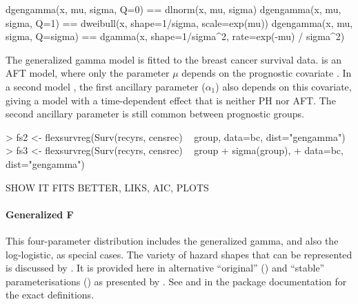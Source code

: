 \documentclass[nojss,nofooter]{jss}
\begin{document}
\begin{Code}
dgengamma(x, mu, sigma, Q=0)     ==  dlnorm(x, mu, sigma)                                
dgengamma(x, mu, sigma, Q=1)     ==  dweibull(x, shape=1/sigma, scale=exp(mu))           
dgengamma(x, mu, sigma, Q=sigma) ==  dgamma(x, shape=1/sigma^2, 
                                               rate=exp(-mu) / sigma^2)  
\end{Code}

The generalized gamma model is fitted to the breast cancer survival
data.  is an AFT model, where only the parameter
$\mu$ depends on the prognostic covariate .  In a second
model , the first ancillary parameter  ($\alpha_1$) also
depends on this covariate, giving a model with a time-dependent effect
that is neither PH nor AFT.  The second ancillary parameter 
is still common between prognostic groups.
\begin{Schunk}
\begin{Sinput}
> fs2 <- flexsurvreg(Surv(recyrs, censrec) ~ group, data=bc, dist="gengamma")
> fs3 <- flexsurvreg(Surv(recyrs, censrec) ~ group + sigma(group), 
+                    data=bc, dist="gengamma")
\end{Sinput}
\end{Schunk}
SHOW IT FITS BETTER, LIKS, AIC, PLOTS

\paragraph{Generalized F} This four-parameter distribution includes
the generalized gamma, and also the log-logistic, as special cases.
The variety of hazard shapes that can be represented is discussed by
\citet{ccox:genf}.  It is provided here in alternative ``original''
() and ``stable'' parameterisations
() as presented by \citet{prentice:genf}. 
See  and  in the package documentation 
for the exact definitions.
\end{document}
